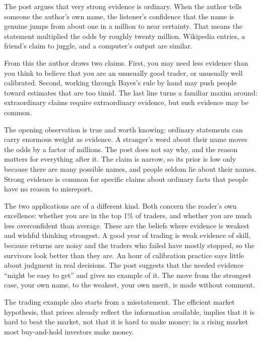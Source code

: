 \begin{afterword}
\summaryhead

The post argues that very strong evidence is ordinary. When the author tells someone the author's own name, the listener's confidence that the name is genuine jumps from about one in a million to near certainty. That means the statement multiplied the odds by roughly twenty million. Wikipedia entries, a friend's claim to juggle, and a computer's output are similar.

From this the author draws two claims. First, you may need less evidence than you think to believe that you are an unusually good trader, or unusually well calibrated. Second, working through Bayes's rule by hand may push people toward estimates that are too timid. The last line turns a familiar maxim around: extraordinary claims require extraordinary evidence, but such evidence may be common.

\responsehead

The opening observation is true and worth knowing: ordinary statements can carry enormous weight as evidence. A stranger's word about their name moves the odds by a factor of millions. The post does not say why, and the reason matters for everything after it. The claim is narrow, so its prior is low only because there are many possible names, and people seldom lie about their names. Strong evidence is common for specific claims about ordinary facts that people have no reason to misreport.

The two applications are of a different kind. Both concern the reader's own excellence: whether you are in the top 1\% of traders, and whether you are much less overconfident than average. These are the beliefs where evidence is weakest and wishful thinking strongest. A good year of trading is weak evidence of skill, because returns are noisy and the traders who failed have mostly stopped, so the survivors look better than they are. An hour of calibration practice says little about judgment in real decisions. The post suggests that the needed evidence ``might be easy to get'' and gives no example of it. The move from the strongest case, your own name, to the weakest, your own merit, is made without comment.

The trading example also starts from a misstatement. The efficient market hypothesis, that prices already reflect the information available, implies that it is hard to beat the market, not that it is hard to make money; in a rising market most buy-and-hold investors make money.


\end{afterword}
